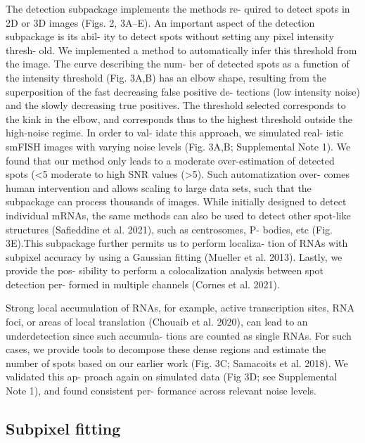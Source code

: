 The detection subpackage implements the methods re- quired to detect spots in
2D or 3D images (Figs. 2, 3A–E). An important aspect of the detection subpackage
is its abil- ity to detect spots without setting any pixel intensity thresh- old.
We implemented a method to automatically infer this threshold from the image.
The curve describing the num- ber of detected spots as a function of the
intensity threshold (Fig. 3A,B) has an elbow shape, resulting from the superposition
of the fast decreasing false positive de- tections (low intensity noise) and the
slowly decreasing true positives. The threshold selected corresponds to the kink
in the elbow, and corresponds thus to the highest threshold outside the high-noise
regime. In order to val- idate this approach, we simulated real- istic smFISH images
with varying noise levels (Fig. 3A,B; Supplemental Note 1). We found that our method
only leads to a moderate over-estimation of detected spots (<5%
moderate to high SNR values (>5). Such automatization over- comes human intervention
and allows scaling to large data sets, such that the subpackage can process thousands
of images. While initially designed to detect individual mRNAs, the same methods
can also be used to detect other spot-like structures (Safieddine et al. 2021),
such as centrosomes, P- bodies, etc (Fig. 3E).This subpackage further permits us
to perform localiza- tion of RNAs with subpixel accuracy by using a Gaussian
fitting (Mueller et al. 2013). Lastly, we provide the pos- sibility to perform
a colocalization analysis between spot detection per- formed in multiple channels (Cornes et al. 2021).


Strong local accumulation of RNAs, for example, active transcription sites, RNA
foci, or areas of local translation (Chouaib et al. 2020), can lead to an
underdetection since such accumula- tions are counted as single RNAs. For
such cases, we provide tools to decompose these dense regions and estimate
the number of spots based on our earlier work (Fig. 3C; Samacoits et al. 2018).
We validated this ap- proach again on simulated data (Fig 3D; see Supplemental Note 1),
and found consistent per- formance across relevant noise levels.

\subsection{Subpixel fitting}



